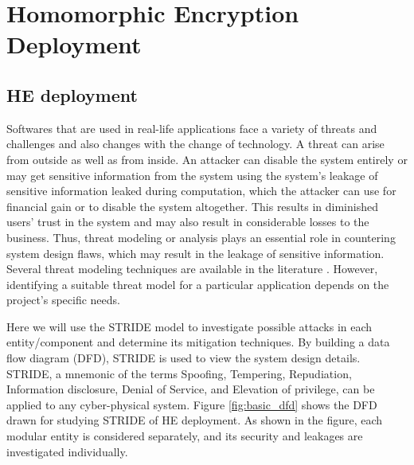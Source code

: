 
\chapter{Homomorphic Encryption Deployment}
\setcounter{section}{0}

\section{HE deployment}

Softwares that are used in real-life applications face a variety of threats and challenges and also changes with the change of technology. A threat can arise from outside as well as from inside. An attacker can disable the system entirely or may get sensitive information from the system using the system's leakage of sensitive information leaked during computation, which the attacker can use for financial gain or to disable the system altogether. This results in diminished users' trust in the system and may also result in considerable losses to the business. Thus, threat modeling or analysis plays an essential role in countering  system design flaws, which may result in the leakage of sensitive information. Several threat modeling techniques are available in the literature \cite{shevchenko_2018}. However, identifying a suitable threat model for a particular application depends on the project's specific needs.

Here we will use the STRIDE \cite{The_Threat_Model} model to investigate possible attacks in each entity/component and determine its mitigation techniques. By building a data flow diagram (DFD), STRIDE is used to view the system design details. STRIDE, a mnemonic of the terms Spoofing, Tempering, Repudiation, Information disclosure, Denial of Service, and Elevation of privilege, can be applied to any cyber-physical system. Figure \ref{fig:basic_dfd} shows the DFD drawn for studying STRIDE of HE deployment. As shown in the figure, each modular entity is considered separately, and its security and leakages are investigated individually.

